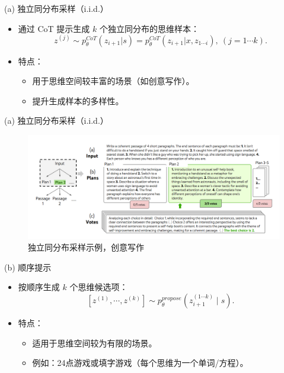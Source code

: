 \begin{frame}{(a) 独立同分布采样（i.i.d.）}
\begin{itemize}
    \item 通过 CoT 提示生成 $k$ 个独立同分布的思维样本：
    \[
    z^{(j)} \sim p_\theta^{CoT}(z_{i+1} | s) = p_\theta^{CoT}(z_{i+1} | x, z_{1 \cdots i}), \ (j = 1 \cdots k).
    \]
	
	\pause
    \item 特点：
    \begin{itemize}
        \item 用于思维空间较丰富的场景（如创意写作）。
        \item 提升生成样本的多样性。
    \end{itemize}
\end{itemize}
\end{frame}
\begin{frame}{(a) 独立同分布采样（i.i.d.）}
\begin{figure}
	\centering
	\includegraphics[width=.9\linewidth]{./pic/8.png}
	\caption{独立同分布采样示例，创意写作}
\end{figure}
\end{frame}

\begin{frame}{(b) 顺序提示}
\begin{itemize}
    \item 按顺序生成 $k$ 个思维候选项：
    \[
    [z^{(1)}, \cdots, z^{(k)}] \sim p_\theta^{propose}(z_{i+1}^{(1 \cdots k)} \mid s).
    \]
	
	\pause
    \bigskip
    \item 特点：
    \begin{itemize}
        \item 适用于思维空间较为有限的场景。
        \item 例如：24点游戏或填字游戏（每个思维为一个单词/方程）。
    \end{itemize}
\end{itemize}
\end{frame}

